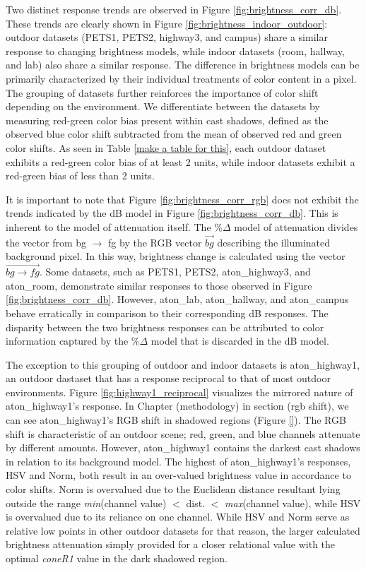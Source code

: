 \documentclass[12pt]{report}
\begin{document}
Two distinct response trends are observed in Figure \ref{fig:brightness_corr_db}. These trends are clearly shown in Figure \ref{fig:brightness_indoor_outdoor}: outdoor datasets (PETS1, PETS2, highway3, and campus) share a similar response to changing brightness models, while indoor datasets (room, hallway, and lab) also share a similar response. The difference in brightness models can be primarily characterized by their individual treatments of color content in a pixel. The grouping of datasets further reinforces the importance of color shift depending on the environment. We differentiate between the datasets by measuring red-green color bias present within cast shadows, defined as the observed blue color shift subtracted from the mean of observed red and green color shifts. As seen in Table \ref{make a table for this}, each outdoor dataset exhibits a red-green color bias of at least 2 units, while indoor datasets exhibit a red-green bias of less than 2 units.

It is important to note that Figure \ref{fig:brightness_corr_rgb} does not exhibit the trends indicated by the dB model in Figure \ref{fig:brightness_corr_db}. This is inherent to the model of attenuation itself. The \%$\Delta$ model of attenuation divides the vector from bg $\rightarrow$ fg by the RGB vector $\vec{bg}$ describing the illuminated background pixel. In this way, brightness change is calculated using the vector $\vec{bg \rightarrow fg}$. Some datasets, such as PETS1, PETS2, aton\_highway3, and aton\_room, demonstrate similar responses to those observed in Figure \ref{fig:brightness_corr_db}. However, aton\_lab, aton\_hallway, and aton\_campus behave erratically in comparison to their corresponding dB responses. The disparity between the two brightness responses can be attributed to color information captured by the \%$\Delta$ model that is discarded in the dB model.

The exception to this grouping of outdoor and indoor datasets is aton\_highway1, an outdoor dastaset that has a response reciprocal to that of most outdoor environments. Figure \ref{fig:highway1_reciprocal} visualizes the mirrored nature of aton\_highway1's response. In Chapter (methodology) in section (rgb shift), we can see aton\_highway1's RGB shift in shadowed regions (Figure \ref{}). The RGB shift is characteristic of an outdoor scene; red, green, and blue channels attenuate by different amounts. However, aton\_highway1 contains the darkest cast shadows in relation to its background model. The highest of aton\_highway1's responses, HSV and Norm, both result in an over-valued brightness value in accordance to color shifts. Norm is overvalued due to the Euclidean distance resultant lying outside the range \textit{min}(channel value) $<$ dist. $<$ \textit{max}(channel value), while HSV is overvalued due to its reliance on one channel. While HSV and Norm serve as relative low points in other outdoor datasets for that reason, the larger calculated brightness attenuation simply provided for a closer relational value with the optimal \textit{coneR1} value in the dark shadowed region.
\end{document}
